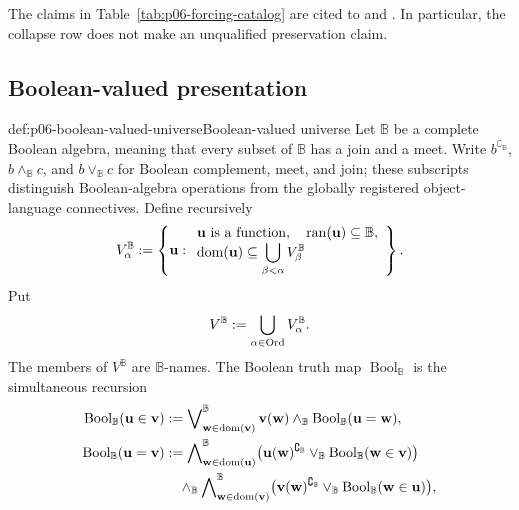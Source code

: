 The claims in Table~\ref{tab:p06-forcing-catalog} are cited to
\textcite[pp.~201--265]{Jech2003} and
\textcite[chs.~2, 4, and 5]{Bell2005}.  In particular, the collapse row does
not make an unqualified preservation claim.

\subsection{Boolean-valued presentation}

\begin{hbdefinition}{def:p06-boolean-valued-universe}{Boolean-valued universe}
Let \(\mathbb B\) be a complete Boolean algebra, meaning that every subset of
\(\mathbb B\) has a join and a meet.  Write
\(b^{\complement_{\mathbb B}}\), \(b\wedge_{\mathbb B}c\), and
\(b\vee_{\mathbb B}c\) for Boolean complement, meet, and join; these
subscripts distinguish Boolean-algebra operations from the globally
registered object-language connectives.  Define recursively
\[
  V^{\mathbb B}_\alpha
  \mathrel{:=}\left\{\mathbf u:
      \begin{array}{l}
      \mathbf u\text{ is a function},\quad
      \operatorname{ran}(\mathbf u)\subseteq\mathbb B,\\
      \operatorname{dom}(\mathbf u)\subseteq
        \displaystyle\bigcup_{\beta<\alpha}V^{\mathbb B}_\beta
      \end{array}\right\}.
\]
Put
\[
  V^{\mathbb B}\mathrel{:=}
  \bigcup_{\alpha\in\operatorname{Ord}}V^{\mathbb B}_\alpha.
\]
The members of \(V^{\mathbb B}\) are \(\mathbb B\)-names.  The Boolean truth
map \(\operatorname{Bool}_{\mathbb B}\) is the simultaneous recursion
\[
\begin{aligned}
 \operatorname{Bool}_{\mathbb B}(\mathbf u\in\mathbf v)
   &\defeq\mathop{\bigvee}\nolimits^{\mathbb B}_{\mathbf w\in\dom(\mathbf v)}
       \mathbf v(\mathbf w)\wedge_{\mathbb B}
       \operatorname{Bool}_{\mathbb B}(\mathbf u=\mathbf w),\\
 \operatorname{Bool}_{\mathbb B}(\mathbf u=\mathbf v)
   &\defeq\mathop{\bigwedge}\nolimits^{\mathbb B}_{\mathbf w\in\dom(\mathbf u)}
       \bigl(\mathbf u(\mathbf w)^{\complement_{\mathbb B}}\vee_{\mathbb B}
             \operatorname{Bool}_{\mathbb B}(\mathbf w\in\mathbf v)\bigr)\\
   &\quad\wedge_{\mathbb B}
     \mathop{\bigwedge}\nolimits^{\mathbb B}_{\mathbf w\in\dom(\mathbf v)}
       \bigl(\mathbf v(\mathbf w)^{\complement_{\mathbb B}}\vee_{\mathbb B}
             \operatorname{Bool}_{\mathbb B}(\mathbf w\in\mathbf u)\bigr),\\

\end{aligned}\]
\end{hbdefinition}
